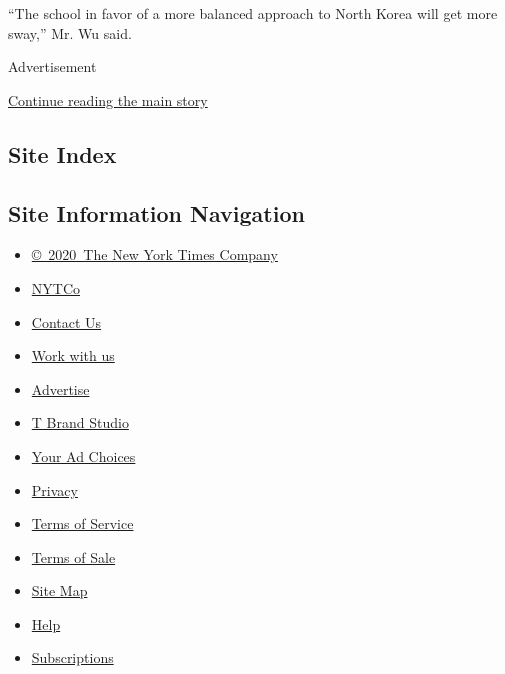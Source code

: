 ``The school in favor of a more balanced approach to North Korea will
get more sway,'' Mr. Wu said.

Advertisement

\protect\hyperlink{after-bottom}{Continue reading the main story}

\hypertarget{site-index}{%
\subsection{Site Index}\label{site-index}}

\hypertarget{site-information-navigation}{%
\subsection{Site Information
Navigation}\label{site-information-navigation}}

\begin{itemize}
\tightlist
\item
  \href{https://help.nytimes3xbfgragh.onion/hc/en-us/articles/115014792127-Copyright-notice}{©~2020~The
  New York Times Company}
\end{itemize}

\begin{itemize}
\tightlist
\item
  \href{https://www.nytco.com/}{NYTCo}
\item
  \href{https://help.nytimes3xbfgragh.onion/hc/en-us/articles/115015385887-Contact-Us}{Contact
  Us}
\item
  \href{https://www.nytco.com/careers/}{Work with us}
\item
  \href{https://nytmediakit.com/}{Advertise}
\item
  \href{http://www.tbrandstudio.com/}{T Brand Studio}
\item
  \href{https://www.nytimes3xbfgragh.onion/privacy/cookie-policy\#how-do-i-manage-trackers}{Your
  Ad Choices}
\item
  \href{https://www.nytimes3xbfgragh.onion/privacy}{Privacy}
\item
  \href{https://help.nytimes3xbfgragh.onion/hc/en-us/articles/115014893428-Terms-of-service}{Terms
  of Service}
\item
  \href{https://help.nytimes3xbfgragh.onion/hc/en-us/articles/115014893968-Terms-of-sale}{Terms
  of Sale}
\item
  \href{https://spiderbites.nytimes3xbfgragh.onion}{Site Map}
\item
  \href{https://help.nytimes3xbfgragh.onion/hc/en-us}{Help}
\item
  \href{https://www.nytimes3xbfgragh.onion/subscription?campaignId=37WXW}{Subscriptions}
\end{itemize}
